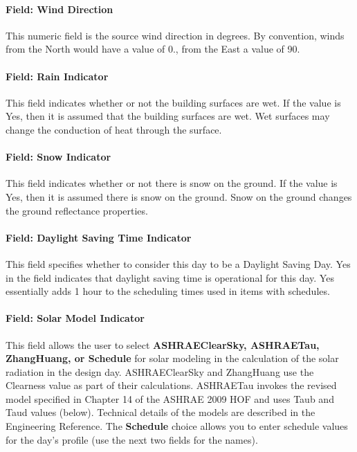 \paragraph{Field: Wind Direction}\label{field-wind-direction}

This numeric field is the source wind direction in degrees. By convention, winds from the North would have a value of 0., from the East a value of 90.

\paragraph{Field: Rain Indicator}\label{field-rain-indicator}

This field indicates whether or not the building surfaces are wet. If the value is Yes, then it is assumed that the building surfaces are wet. Wet surfaces may change the conduction of heat through the surface.

\paragraph{Field: Snow Indicator}\label{field-snow-indicator}

This field indicates whether or not there is snow on the ground. If the value is Yes, then it is assumed there is snow on the ground. Snow on the ground changes the ground reflectance properties.

\paragraph{Field: Daylight Saving Time Indicator}\label{field-daylight-saving-time-indicator}

This field specifies whether to consider this day to be a Daylight Saving Day. Yes in the field indicates that daylight saving time is operational for this day. Yes essentially adds 1 hour to the scheduling times used in items with schedules.

\paragraph{Field: Solar Model Indicator}\label{field-solar-model-indicator}

This field allows the user to select \textbf{ASHRAE\-Clear\-Sky, ASHRAE\-Tau, Zhang\-Huang, or Sche\-dule} for solar modeling in the calculation of the solar radiation in the design day. ASHRAE\-Clear\-Sky and Zhang\-Huang use the Clearness value as part of their calculations. ASHRAE\-Tau invokes the revised model specified in Chapter 14 of the ASHRAE 2009 HOF and uses Taub and Taud values (below). Technical details of the models are described in the Engineering Reference. The \textbf{Schedule} choice allows you to enter schedule values for the day's profile (use the next two fields for the names).

